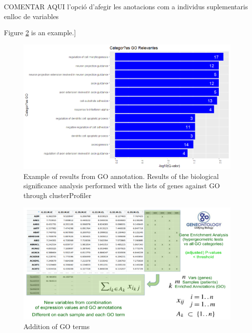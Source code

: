 \documentclass[a4paper, nobind]{templates/ociamthesis}
\begin{document}
COMENTAR AQUI l'opció d'afegir les anotacions com a individus suplementaris enlloc de variables

Figure \ref{fig:fig3-1} is an example.{]}

\begin{figure}

{\centering \includegraphics[width=0.95\linewidth]{figures/chapter3/3-12_clusterprofiler_results} 

}

\caption[Example of results from GO annotation]{Example of results from GO annotation. Results of the biological significance analysis performed with the lists of genes against GO through clusterProfiler}\label{fig:fig3-12}
\end{figure}

\clearpage

\begin{figure}

{\centering \includegraphics[width=0.95\linewidth]{figures/chapter3/3-1_addition_of_GO_terms} 

}

\caption{Addition of GO terms}\label{fig:fig3-1}
\end{figure}
\end{document}
